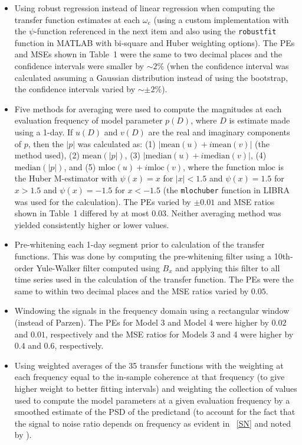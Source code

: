 \documentclass[draft,linenumbers]{agujournal2018}
\begin{document}
\begin{itemize}
\item Using robust regression instead of linear regression when computing the transfer function estimates at each $\omega_e$ (using a custom implementation with the $\psi$-function referenced in the next item and also using the \texttt{robustfit} function in MATLAB with bi-square and Huber weighting options). The PEs and MSEs shown in Table~1 were the same to two decimal places and the confidence intervals were smaller by $\sim 2$\% (when the confidence interval was calculated assuming a Gaussian distribution instead of using the bootstrap, the confidence intervals varied by $\sim\pm 2$\%).

\item Five methods for averaging were used to compute the magnitudes at each evaluation frequency of model parameter $p(D)$, where $D$ is estimate made using a 1-day. If $u(D)$ and $v(D)$ are the real and imaginary components of $p$, then the $|p|$ was calculated as: (1) $|\text{mean}(u)+i\text{mean}(v)|$ (the method used), (2) $\text{mean}(|p|)$, (3) $|\text{median}(u)+i\text{median}(v)|$, (4) $\text{median}(|p|)$, and (5) $\text{mloc}(u) + i\text{mloc}(v)$, where the function $\text{mloc}$ is the Huber M-estimator \citep{Huber2011} with $\psi(x)=x$ for $|x|<1.5$ and $\psi(x) = 1.5$ for $x>1.5$ and $\psi(x) = -1.5$ for $x<-1.5$ (the \texttt{mlochuber} function in LIBRA \citep{Verboven2010} was used for the calculation). The PEs varied by $\pm 0.01$ and MSE ratios shown in Table~1 differed by at most $0.03$. Neither averaging method was yielded consistently higher or lower values.

\item Pre-whitening each 1-day segment prior to calculation of the transfer functions. This was done by computing the pre-whitening filter using a 10th-order Yule-Walker filter computed using $B_x$ and applying this filter to all time series used in the calculation of the transfer function. The PEs were the same to within two decimal places and the MSE ratios varied by $0.05$.

\item Windowing the signals in the frequency domain using a rectangular window (instead of Parzen). The PEs for Model 3 and Model 4 were higher by $0.02$ and $0.01$, respectively and the MSE ratios for Models 3 and 4 were higher by $0.4$ and $0.6$, respectively.

\item Using weighted averages of the 35 transfer functions with the weighting at each frequency equal to the in-sample coherence at that frequency (to give higher weight to better fitting intervals) and weighting the collection of values used to compute the model parameters at a given evaluation frequency by a smoothed estimate of the PSD of the predictand (to account for the fact that the signal to noise ratio depends on frequency as evident in ~\ref{SN} and noted by \citep{Egbert1997}).


\end{itemize}
\end{document}
